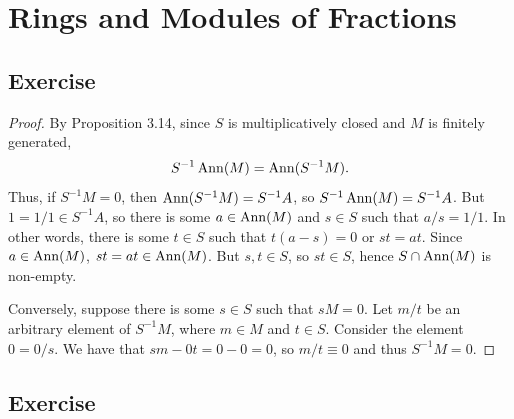 \section{Rings and Modules of Fractions}

\subsection{Exercise}\label{3.1}

\begin{proof}
By Proposition 3.14, since $S$ is multiplicatively closed and $M$ is finitely generated,
$$S^{-1}\operatorname{Ann}(M) = \operatorname{Ann}(S^{-1}M).$$
Thus, if $S^{-1}M = 0$, then $\operatorname{Ann}(S^{-1}M) = S^{-1}A$, so $S^{-1}\operatorname{Ann}(M) = S^{-1}A$. But $1 = 1/1 \in S^{-1}A$, so there is some $a \in \operatorname{Ann}(M)$ and $s \in S$
such that $a/s = 1/1$. In other words, there is some $t \in S$ such that $t(a-s)=0$ or $st = at$. Since $a \in \operatorname{Ann}(M)$, $st = at \in \operatorname{Ann}(M)$. But $s,t \in S$, so $st \in S$,
hence $S \cap \operatorname{Ann}(M)$ is non-empty.

Conversely, suppose there is some $s \in S$ such that $sM = 0$. Let $m/t$ be an arbitrary element of $S^{-1}M$, where $m \in M$ and $t \in S$. Consider the element $0 = 0/s$. We have that
$sm - 0t = 0 - 0 = 0$, so $m/t \equiv 0$ and thus $S^{-1}M = 0$.
\end{proof}

\subsection{Exercise}\label{3.2}

